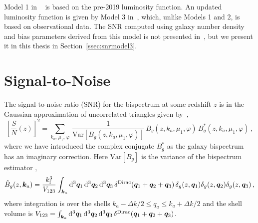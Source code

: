 Model 1 in ~\cite{Pozzetti:2016cch} is based on the pre-2019 luminosity function. An updated luminosity function is given by Model 3 in~\cite{Pozzetti:2016cch}, which, unlike Models 1 and 2, is based on observational data. The SNR computed using galaxy number density and bias parameters derived from this model is not presented in~\cite{Maartens:2019yhx}, but we present it in this thesis in Section~\ref{ssec:snrmodel3}.


\section{Signal-to-Noise}

The signal-to-noise ratio (SNR) for the bispectrum at some redshift $z$ is in the Gaussian approximation of uncorrelated triangles given by~\citep{Scoccimarro:2003wn}, 
\begin{equation}
\left[\frac{S}{N}(z)\right]^{2} = 
\sum_{k_a,\,\mu_{1},\,\varphi}\,\frac{1}{{\mathrm{Var}} [{B_{g}}(z, k_a,\mu_{1},\varphi)]}
\,B_{g}(z, k_{a},  \mu_{1},\varphi)\,B^*_{g}(z, k_a, \mu_{1},\varphi)\,,\label{eq:snrdef} 
\end{equation} 
where we have introduced the complex conjugate $B^*_g$ as the galaxy bispectrum has an imaginary correction. Here ${\mathrm{Var}} [{B_{g}}]$ is the variance of the bispectrum estimator \citep{Chan:2016ehg},
\begin{equation} \label{hatb}
\hat{B}_g(z,\bm{k}_a) = \frac{k_{\mathrm{f}}^3}{V_{123}}\int_{\bm{k}_a}\mathrm{d}^3\bm{q}_1\, \mathrm{d}^3\bm{q}_2 \,\mathrm{d}^3\bm{q}_3\,\delta^{{\mathrm{Dirac}}}(\bm{q}_1+\bm{q}_2+\bm{q}_3)\, \delta_g(z,\bm{q}_1) \delta_g(z,\bm{q}_2) \delta_g(z,\bm{q}_3) \,,
\end{equation}
where integration is over the shells $k_a-\Delta k/2\leq q_a \leq k_a+\Delta k/2$ and  the shell volume is
$V_{123}=\int_{\bm{k}_a}\mathrm{d}^3\bm{q}_1\, \mathrm{d}^3\bm{q}_2 \,\mathrm{d}^3\bm{q}_3\,\delta^{{\mathrm{Dirac}}}(\bm{q}_1+\bm{q}_2+\bm{q}_3)$.


